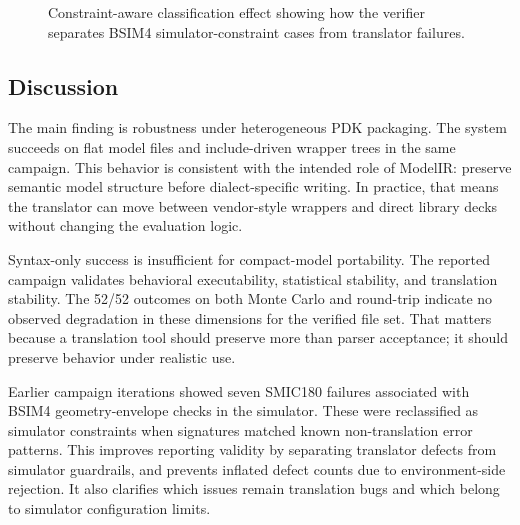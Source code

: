 \documentclass[10pt,twocolumn,a4paper]{article}
\begin{document}
\begin{figure}[t]
\centering
{}
\caption{Constraint-aware classification effect showing how the verifier separates BSIM4 simulator-constraint cases from translator failures.}
\label{fig:constraint_classification}
\end{figure}

\subsection{Discussion}
The main finding is robustness under heterogeneous PDK packaging. The system succeeds on flat model files and include-driven wrapper trees in the same campaign. This behavior is consistent with the intended role of ModelIR: preserve semantic model structure before dialect-specific writing. In practice, that means the translator can move between vendor-style wrappers and direct library decks without changing the evaluation logic.

Syntax-only success is insufficient for compact-model portability. The reported campaign validates behavioral executability, statistical stability, and translation stability. The 52/52 outcomes on both Monte Carlo and round-trip indicate no observed degradation in these dimensions for the verified file set. That matters because a translation tool should preserve more than parser acceptance; it should preserve behavior under realistic use.

Earlier campaign iterations showed seven SMIC180 failures associated with BSIM4 geometry-envelope checks in the simulator. These were reclassified as simulator constraints when signatures matched known non-translation error patterns. This improves reporting validity by separating translator defects from simulator guardrails, and prevents inflated defect counts due to environment-side rejection. It also clarifies which issues remain translation bugs and which belong to simulator configuration limits.
\end{document}
